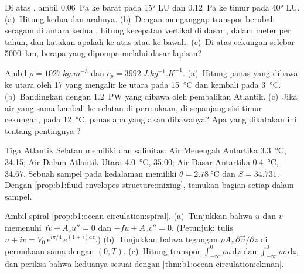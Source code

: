 \begin{exercise}[$\star\star$]\label{exo:b1:ocean-circulation:7}
Di atas , ambil  \qty{0.06}{Pa} ke barat pada \ang{15} LU dan \qty{0.12}{Pa} ke timur pada \ang{40} LU. (a)~Hitung kedua  dan arahnya. (b)~Dengan menganggap transpor berubah seragam di antara kedua , hitung kecepatan vertikal di dasar , dalam meter per tahun, dan katakan apakah ke atas atau ke bawah. (c)~Di atas cekungan selebar \qty{5000}{km}, berapa  yang dipompa melalui dasar lapisan?
\end{exercise}

\begin{exercise}[$\star\star$]\label{exo:b1:ocean-circulation:8}
Ambil $\rho = \qty{1027}{kg.m^{-3}}$ dan $c_p = \qty{3992}{J.kg^{-1}.K^{-1}}$. (a)~Hitung panas yang dibawa ke utara oleh \qty{17}{\sverdrup} yang mengalir ke utara pada \qty{15}{\celsius} dan kembali pada \qty{3}{\celsius}. (b)~Bandingkan dengan \qty{1.2}{PW} yang dibawa oleh pembalikan Atlantik. (c)~Jika air yang sama kembali ke selatan di permukaan, di sepanjang sisi timur cekungan, pada \qty{12}{\celsius}, panas apa yang akan dibawanya? Apa yang dikatakan ini tentang pentingnya ?
\end{exercise}

\begin{exercise}[$\star\star$]\label{exo:b1:ocean-circulation:9}
Tiga  Atlantik Selatan memiliki  dan salinitas: Air Menengah Antartika \qty{3.3}{\celsius}, 34.15; Air Dalam Atlantik Utara \qty{4.0}{\celsius}, 35.00; Air Dasar Antartika \qty{0.4}{\celsius}, 34.67. Sebuah sampel pada kedalaman memiliki $\theta = \qty{2.78}{\celsius}$ dan $S = 34.731$. Dengan \cref{prop:b1:fluid-envelopes-structure:mixing}, temukan bagian setiap  dalam sampel.
\end{exercise}

\begin{exercise}[$\star\star\star$]\label{exo:b1:ocean-circulation:10}
Ambil spiral \cref{prop:b1:ocean-circulation:spiral}. (a)~Tunjukkan bahwa $u$ dan $v$
memenuhi $f v + A_z u'' = 0$ dan $-f u + A_z v'' = 0$. (Petunjuk: tulis $u + iv =
V_0\,e^{i\pi/4}\,e^{(1+i)az}$.) (b)~Tunjukkan bahwa tegangan $\rho A_z\,\partial\vec
v/\partial z$ di permukaan sama dengan  $(0, T)$. (c)~Hitung transpor $\int_{-\infty}^0 \rho u\,\mathrm dz$ dan $\int_{-\infty}^0 \rho
v\,\mathrm dz$, dan periksa bahwa keduanya sesuai dengan
\cref{thm:b1:ocean-circulation:ekman}.
\end{exercise}

